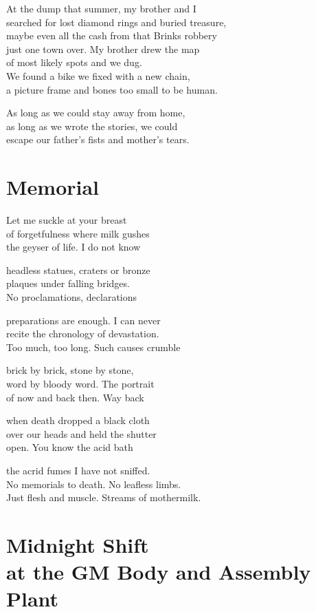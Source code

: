\documentclass[twoside,10pt]{book}
\begin{document}
At the dump that summer, my brother and I\\
searched for lost diamond rings and buried treasure,\\
maybe even all the cash from that Brinks robbery\\
just one town over. My brother drew the map\\
of most likely spots and we dug.\\
We found a bike we fixed with a new chain,\\
a picture frame and bones too small to be human.

As long as we could stay away from home,\\
as long as we wrote the stories, we could\\
escape our father's fists and mother's tears.


\clearpage
\section{Memorial}

Let me suckle at your breast\\
of forgetfulness where milk gushes\\
the geyser of life. I do not know

headless statues, craters or bronze\\
plaques under falling bridges.\\
No proclamations, declarations

preparations are enough. I can never\\
recite the chronology of devastation.\\
Too much, too long. Such causes crumble

brick by brick, stone by stone,\\
word by bloody word. The portrait\\
of now and back then. Way back

when death dropped a black cloth\\
over our heads and held the shutter\\
open. You know the acid bath

the acrid fumes I have not sniffed.\\
No memorials to death. No leafless limbs.\\
Just flesh and muscle. Streams of mothermilk.


\clearpage
\section{Midnight Shift\\ at the GM Body and Assembly Plant}
\end{document}
